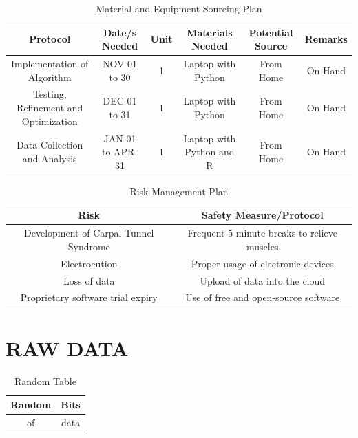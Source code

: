 \documentclass{strrespaper-trad}
\begin{document}
\begin{landscape}
			\begin{table}[htbp]
				\centering
				\caption{Material and Equipment Sourcing Plan}
				\label{tab:material_equipment_sourcing}
				\begin{tabular}{cccccc}
					\toprule
					Protocol                             & Date/s Needed    & Unit & Materials Needed         & Potential Source & Remarks \\
					\midrule
					Implementation of Algorithm          & NOV-01 to 30     & 1    & Laptop with Python       & From Home        & On Hand \\
					Testing, Refinement and Optimization & DEC-01 to 31     & 1    & Laptop with Python       & From Home        & On Hand \\
					Data Collection and Analysis         & JAN-01 to APR-31 & 1    & Laptop with Python and R & From Home        & On Hand \\
					\bottomrule
				\end{tabular}
			\end{table}

			\begin{table}[htbp]
				\centering
				\caption{Risk Management Plan}
				\label{tab:risk_management}
				\begin{tabularx}{\textwidth}{cc}
					\toprule
					Risk                                  & Safety Measure/Protocol                     \\
					\midrule
					Development of Carpal Tunnel Syndrome & Frequent 5-minute breaks to relieve muscles \\
					Electrocution                         & Proper usage of electronic devices          \\
					Loss of data                          & Upload of data into the cloud               \\
					Proprietary software trial expiry     & Use of free and open-source software        \\
					\bottomrule
				\end{tabularx}
			\end{table}
		\end{landscape}

	\section{RAW DATA}
		\begin{table}[htbp]
			\centering
			\caption{Random Table}
			\label{tab:random}
			\begin{tabular}{cc}
				\toprule
				Random & Bits \\
				\midrule
				of     & data \\
				\bottomrule
			\end{tabular}
		\end{table}
		\lstset{language=Python, breaklines=true, numbers=left, stringstyle=\ttfamily\small, basicstyle=\singlespacing}
\end{document}
